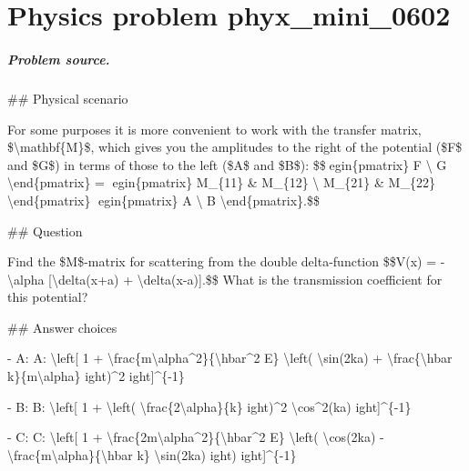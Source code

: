 
\chapter{Physics problem phyx\_mini\_0602}
\label{ch:PhyXMiniProblems_problem_phyx_mini_0602}

\paragraph{Problem source.}
\#\# Physical scenario

For some purposes it is more convenient to work with the transfer matrix, \$\textbackslash{}mathbf\{M\}\$, which gives you the amplitudes to the right of the potential (\$F\$ and \$G\$) in terms of those to the left (\$A\$ and \$B\$): \$\$egin\{pmatrix\} F \textbackslash{} G \textbackslash{}end\{pmatrix\} = egin\{pmatrix\} M\_\{11\} \& M\_\{12\} \textbackslash{} M\_\{21\} \& M\_\{22\} \textbackslash{}end\{pmatrix\} egin\{pmatrix\} A \textbackslash{} B \textbackslash{}end\{pmatrix\}.\$\$

\#\# Question

Find the \$M\$-matrix for scattering from the double delta-function \$\$V(x) = -\textbackslash{}alpha [\textbackslash{}delta(x+a) + \textbackslash{}delta(x-a)].\$\$ What is the transmission coefficient for this potential?

\#\# Answer choices

- A: A: \textbackslash{}left[ 1 + \textbackslash{}frac\{m\textbackslash{}alpha\textasciicircum{}2\}\{\textbackslash{}hbar\textasciicircum{}2 E\} \textbackslash{}left( \textbackslash{}sin(2ka) + \textbackslash{}frac\{\textbackslash{}hbar k\}\{m\textbackslash{}alpha\} 
ight)\textasciicircum{}2 
ight]\textasciicircum{}\{-1\}

- B: B: \textbackslash{}left[ 1 + \textbackslash{}left( \textbackslash{}frac\{2\textbackslash{}alpha\}\{k\} 
ight)\textasciicircum{}2 \textbackslash{}cos\textasciicircum{}2(ka) 
ight]\textasciicircum{}\{-1\}

- C: C: \textbackslash{}left[ 1 + \textbackslash{}frac\{2m\textbackslash{}alpha\textasciicircum{}2\}\{\textbackslash{}hbar\textasciicircum{}2 E\} \textbackslash{}left( \textbackslash{}cos(2ka) - \textbackslash{}frac\{m\textbackslash{}alpha\}\{\textbackslash{}hbar k\} \textbackslash{}sin(2ka) 
ight) 
ight]\textasciicircum{}\{-1\}

